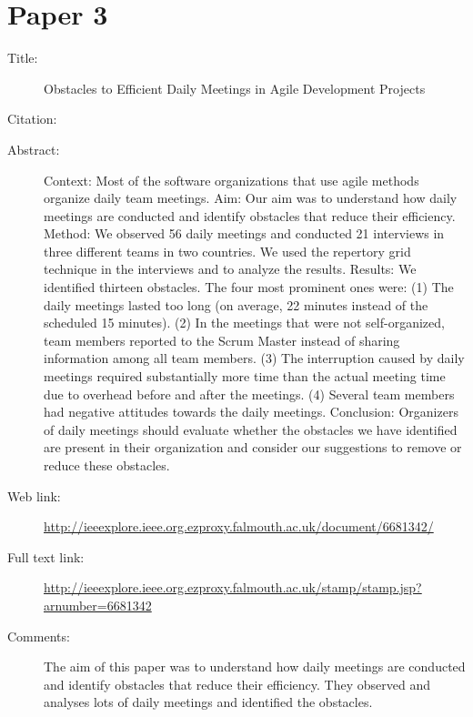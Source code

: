 \documentclass{scrartcl}
\begin{document}
\section*{Paper 3}
\begin{description}
\item[Title:] Obstacles to Efficient Daily Meetings in Agile Development Projects
\item[Citation:] \cite{bibtex_key}
\item[Abstract:] Context: Most of the software organizations that use agile methods organize daily team meetings. Aim: Our aim was to understand how daily meetings are conducted and identify obstacles that reduce their efficiency. Method: We observed 56 daily meetings and conducted 21 interviews in three different teams in two countries. We used the repertory grid technique in the interviews and to analyze the results. Results: We identified thirteen obstacles. The four most prominent ones were: (1) The daily meetings lasted too long (on average, 22 minutes instead of the scheduled 15 minutes). (2) In the meetings that were not self-organized, team members reported to the Scrum Master instead of sharing information among all team members. (3) The interruption caused by daily meetings required substantially more time than the actual meeting time due to overhead before and after the meetings. (4) Several team members had negative attitudes towards the daily meetings. Conclusion: Organizers of daily meetings should evaluate whether the obstacles we have identified are present in their organization and consider our suggestions to remove or reduce these obstacles.
\item[Web link:] \url{http://ieeexplore.ieee.org.ezproxy.falmouth.ac.uk/document/6681342/}
\item[Full text link:] \url{http://ieeexplore.ieee.org.ezproxy.falmouth.ac.uk/stamp/stamp.jsp?arnumber=6681342}
\item[Comments:] The aim of this paper was to understand how daily meetings are conducted and identify obstacles that reduce their efficiency. They observed and analyses lots of daily meetings and identified the obstacles. 
\end{description}
\end{document}
